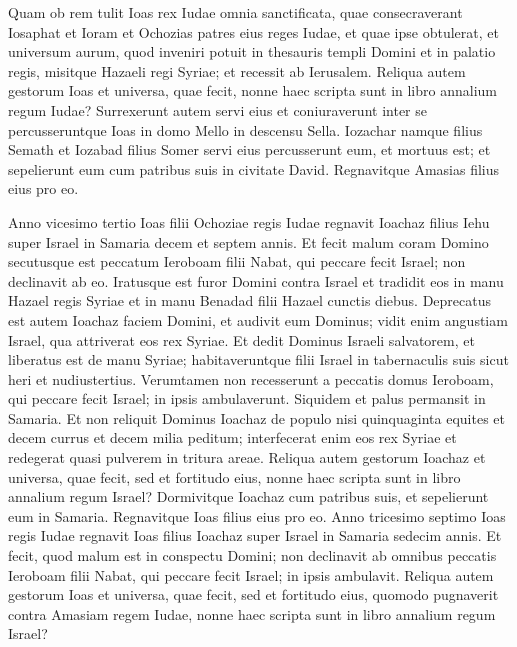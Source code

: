 \begin{biblechapter}
\verse Quam ob rem tulit Ioas rex Iudae omnia sanctificata, quae consecraverant Iosaphat et Ioram et Ochozias patres eius reges Iudae, et quae ipse obtulerat, et universum aurum, quod inveniri potuit in thesauris templi Domini et in palatio regis, misitque Hazaeli regi Syriae; et recessit ab Ierusalem. 
\verse Reliqua autem gestorum Ioas et universa, quae fecit, nonne haec scripta sunt in libro annalium regum Iudae? 
\verse Surrexerunt autem servi eius et coniuraverunt inter se percusseruntque Ioas in domo Mello in descensu Sella.  
\verse Iozachar namque filius Semath et Iozabad filius Somer servi eius percusserunt eum, et mortuus est; et sepelierunt eum cum patribus suis in civitate David. Regnavitque Amasias filius eius pro eo. 
\end{biblechapter}

\begin{biblechapter}  
\verse Anno vicesimo tertio Ioas filii Ochoziae regis Iudae regnavit Ioachaz filius Iehu super Israel in Samaria decem et septem annis. 
\verse Et fecit malum coram Domino secutusque est peccatum Ieroboam filii Nabat, qui peccare fecit Israel; non declinavit ab eo. 
\verse Iratusque est furor Domini contra Israel et tradidit eos in manu Hazael regis Syriae et in manu Benadad filii Hazael cunctis diebus. 
\verse Deprecatus est autem Ioachaz faciem Domini, et audivit eum Dominus; vidit enim angustiam Israel, qua attriverat eos rex Syriae. 
\verse Et dedit Dominus Israeli salvatorem, et liberatus est de manu Syriae; habitaveruntque filii Israel in tabernaculis suis sicut heri et nudiustertius. 
\verse Verumtamen non recesserunt a peccatis domus Ieroboam, qui peccare fecit Israel; in ipsis ambulaverunt. Siquidem et palus permansit in Samaria. 
\verse Et non reliquit Dominus Ioachaz de populo nisi quinquaginta equites et decem currus et decem milia peditum; interfecerat enim eos rex Syriae et redegerat quasi pulverem in tritura areae. 
\verse Reliqua autem gestorum Ioachaz et universa, quae fecit, sed et fortitudo eius, nonne haec scripta sunt in libro annalium regum Israel? 
\verse Dormivitque Ioachaz cum patribus suis, et sepelierunt eum in Samaria. Regnavitque Ioas filius eius pro eo. 
\verse Anno tricesimo septimo Ioas regis Iudae regnavit Ioas filius Ioachaz super Israel in Samaria sedecim annis. 
\verse Et fecit, quod malum est in conspectu Domini; non declinavit ab omnibus peccatis Ieroboam filii Nabat, qui peccare fecit Israel; in ipsis ambulavit. 
\verse Reliqua autem gestorum Ioas et universa, quae fecit, sed et fortitudo eius, quomodo pugnaverit contra Amasiam regem Iudae, nonne haec scripta sunt in libro annalium regum Israel? 

\end{biblechapter}
